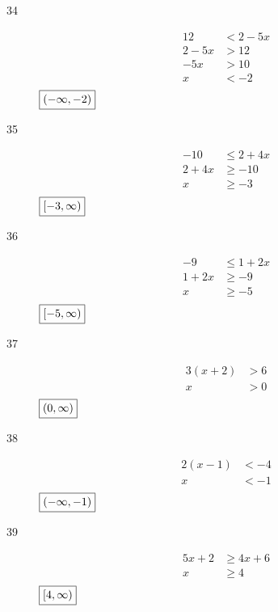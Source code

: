 \documentclass[letterpaper, landscape]{exam}
\begin{document}
\begin{description}
      \item[34]
        \begin{align*}
          12     & < 2 - 5x \\
          2 - 5x & > 12 \\
          -5x    & > 10 \\
          x      & < -2 \\
        \end{align*}
        $\boxed{ \intoo{ -\infty, -2 } }$ 

      \item[35]
        \begin{align*}
          -10    & \leq 2 + 4x \\
          2 + 4x & \geq -10 \\
          x      & \geq -3 \\
        \end{align*}
        $\boxed{ \intco{ -3, \infty} }$

      \item[36]
        \begin{align*}
          -9     & \leq 1 + 2x \\
          1 + 2x & \geq -9 \\
          x      & \geq -5 \\
        \end{align*}
        $\boxed{ \intco{ -5, \infty } }$

      \item[37]
        \begin{align*}
          3 (x + 2) & > 6 \\
          x         & > 0 \\
        \end{align*}
        $\boxed{ \intoo{ 0, \infty } }$

      \item[38]
        \begin{align*}
          2 (x - 1) & < -4 \\
          x         & < -1 \\
        \end{align*}
        $\boxed{ \intoo{ -\infty, -1 } }$

      \item[39]
        \begin{align*}
          5x + 2 & \geq 4x + 6 \\
          x      & \geq 4 \\
        \end{align*}
        $\boxed{ \intco{ 4, \infty } }$


\end{description}
\end{document}
